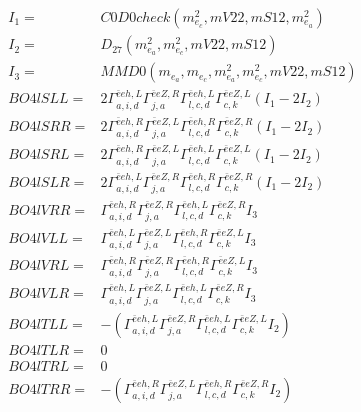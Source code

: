 \documentclass[A4,landscape]{article}
\begin{document}
\begin{align} 
I_1 = & C0D0check(m^2_{e_{{c}}}, mV22, mS12, m^2_{e_{{a}}}) \\ 
I_2 = & D_{27}(m^2_{e_{{a}}}, m^2_{e_{{c}}}, mV22, mS12) \\ 
I_3 = & MMD0(m_{e_{{a}}}, m_{e_{{c}}}, m^2_{e_{{a}}}, m^2_{e_{{c}}}, mV22, mS12) \\ 
  BO4lSLL= & 2  \Gamma^{\bar{e}e h ,L}_{a, i, d} \Gamma^{\bar{e}e Z ,R}_{j, a} \Gamma^{\bar{e}e h ,L}_{l, c, d} \Gamma^{\bar{e}e Z ,L}_{c, k} (I_1 - 2 I_2) \\ 
  BO4lSRR= & 2  \Gamma^{\bar{e}e h ,R}_{a, i, d} \Gamma^{\bar{e}e Z ,L}_{j, a} \Gamma^{\bar{e}e h ,R}_{l, c, d} \Gamma^{\bar{e}e Z ,R}_{c, k} (I_1 - 2 I_2) \\ 
  BO4lSRL= & 2  \Gamma^{\bar{e}e h ,R}_{a, i, d} \Gamma^{\bar{e}e Z ,L}_{j, a} \Gamma^{\bar{e}e h ,L}_{l, c, d} \Gamma^{\bar{e}e Z ,L}_{c, k} (I_1 - 2 I_2) \\ 
  BO4lSLR= & 2  \Gamma^{\bar{e}e h ,L}_{a, i, d} \Gamma^{\bar{e}e Z ,R}_{j, a} \Gamma^{\bar{e}e h ,R}_{l, c, d} \Gamma^{\bar{e}e Z ,R}_{c, k} (I_1 - 2 I_2) \\ 
  BO4lVRR= &  \Gamma^{\bar{e}e h ,R}_{a, i, d} \Gamma^{\bar{e}e Z ,R}_{j, a} \Gamma^{\bar{e}e h ,L}_{l, c, d} \Gamma^{\bar{e}e Z ,R}_{c, k} I_3 \\ 
  BO4lVLL= &  \Gamma^{\bar{e}e h ,L}_{a, i, d} \Gamma^{\bar{e}e Z ,L}_{j, a} \Gamma^{\bar{e}e h ,R}_{l, c, d} \Gamma^{\bar{e}e Z ,L}_{c, k} I_3 \\ 
  BO4lVRL= &  \Gamma^{\bar{e}e h ,R}_{a, i, d} \Gamma^{\bar{e}e Z ,R}_{j, a} \Gamma^{\bar{e}e h ,R}_{l, c, d} \Gamma^{\bar{e}e Z ,L}_{c, k} I_3 \\ 
  BO4lVLR= &  \Gamma^{\bar{e}e h ,L}_{a, i, d} \Gamma^{\bar{e}e Z ,L}_{j, a} \Gamma^{\bar{e}e h ,L}_{l, c, d} \Gamma^{\bar{e}e Z ,R}_{c, k} I_3 \\ 
  BO4lTLL= & -( \Gamma^{\bar{e}e h ,L}_{a, i, d} \Gamma^{\bar{e}e Z ,R}_{j, a} \Gamma^{\bar{e}e h ,L}_{l, c, d} \Gamma^{\bar{e}e Z ,L}_{c, k} I_2) \\ 
  BO4lTLR= & 0 \\ 
  BO4lTRL= & 0 \\ 
  BO4lTRR= & -( \Gamma^{\bar{e}e h ,R}_{a, i, d} \Gamma^{\bar{e}e Z ,L}_{j, a} \Gamma^{\bar{e}e h ,R}_{l, c, d} \Gamma^{\bar{e}e Z ,R}_{c, k} I_2) \\ 
\end{align} 
\end{document}
